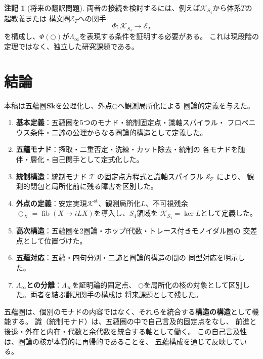 \documentclass[11pt,a4paper]{ltjsarticle}
\theoremstyle{definition}
\newtheorem{remark}{注記}[section]
\newcommand{\Sk}{\mathbf{Sk}}
\newcommand{\T}{\mathcal{T}}
\newcommand{\SpiralT}{\mathcal{S}_{\mathcal{T}}}
\newcommand{\LawvereInfinity}{\Lambda_\infty}
\newcommand{\Kstab}{\mathcal{K}^{\mathrm{st}}}
\newcommand{\KSfour}{\mathcal{K}_{S_4}}
\begin{document}
\begin{remark}[将来の翻訳問題]
両者の接続を検討するには、例えば$\KSfour$から体系$T$の超教義または
構文圏$\mathcal{E}_T$への関手
\[
 \Phi:\KSfour\longrightarrow\mathcal{E}_T
\]
を構成し、$\Phi(\bigcirc)$が$\LawvereInfinity$を表現する条件を証明する必要がある。
これは現段階の定理ではなく、独立した研究課題である。
\end{remark}

\section{結論}

本稿は五蘊圏$\Sk$を公理化し、外点$\bigcirc$へ観測局所化による
圏論的定義を与えた。

\begin{enumerate}
\item \textbf{基本定義}：五蘊圏を5つのモナド・統制固定点・識軸スパイラル・
  フロベニウス条件・二諦の公理からなる圏論的構造として定義した。

\item \textbf{五蘊モナド}：搾取・二重否定・洗練・カット除去・統制の
  各モナドを随伴・層化・自己関手として定式化した。

\item \textbf{統制構造}：統制モナド $\T$ の固定点方程式と識軸スパイラル $\SpiralT$ により、
  観測的閉包と局所化前に残る障害を区別した。

\item \textbf{外点の定義}：安定実現$\Kstab$、観測局所化$L$、不可視残余
  $\bigcirc_X=\operatorname{fib}(X\to iLX)$を導入し、$S_4$領域を
  $\KSfour=\ker L$として定義した。

\item \textbf{高次構造}：五蘊圏を2圏論・ホップf代数・トレース付きモノイダル圏の
  交差点として位置づけた。

\item \textbf{五蘊対応}：五蘊・四句分別・二諦と圏論的構造の間の
  同型対応を明示した。

\item \textbf{$\LawvereInfinity$との分離}：$\LawvereInfinity$を証明論的固定点、
  $\bigcirc$を局所化の核の対象として区別した。両者を結ぶ翻訳関手の構成は
  将来課題として残した。
\end{enumerate}

五蘊圏は、個別のモナドの内容ではなく、それらを統合する\textbf{構造の構造}として機能する。
識（統制モナド）は、五蘊圏の中で自己言及的固定点をなし、
前進と後退・外在と内在・代数と余代数を統合する軸として働く。
この自己言及性は、圏論の核が本質的に再帰的であることを、
五蘊構成を通じて反映している。
\end{document}
